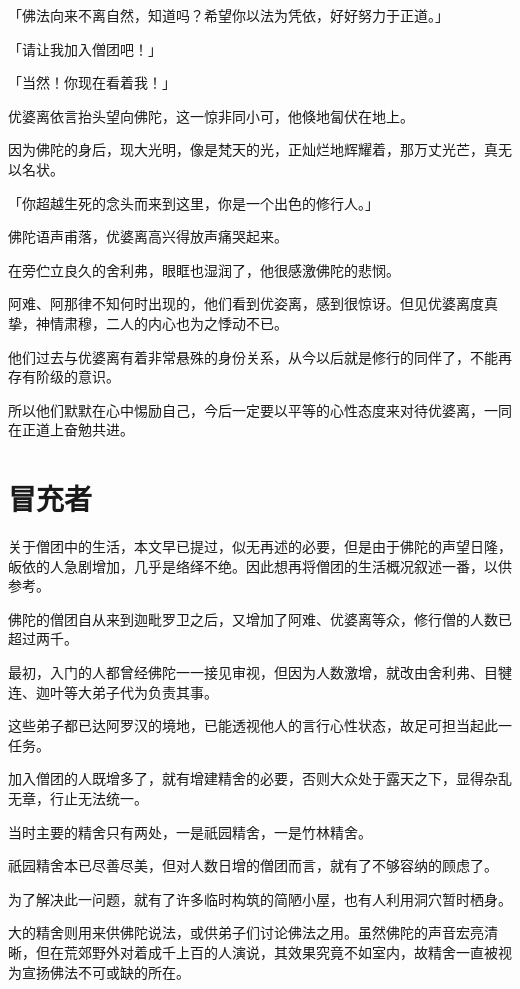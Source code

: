 \documentclass[twoside,openany]{book}
\begin{document}
「佛法向来不离自然，知道吗？希望你以法为凭依，好好努力于正道。」

「请让我加入僧团吧！」

「当然！你现在看着我！」

优婆离依言抬头望向佛陀，这一惊非同小可，他倏地匐伏在地上。

因为佛陀的身后，现大光明，像是梵天的光，正灿烂地辉耀着，那万丈光芒，真无以名状。

「你超越生死的念头而来到这里，你是一个出色的修行人。」

佛陀语声甫落，优婆离高兴得放声痛哭起来。

在旁伫立良久的舍利弗，眼眶也湿润了，他很感激佛陀的悲悯。

阿难、阿那律不知何时出现的，他们看到优姿离，感到很惊讶。但见优婆离度真挚，神情肃穆，二人的内心也为之悸动不已。

他们过去与优婆离有着非常悬殊的身份关系，从今以后就是修行的同伴了，不能再存有阶级的意识。

所以他们默默在心中惕励自己，今后一定要以平等的心性态度来对待优婆离，一同在正道上奋勉共进。

\section{冒充者}\label{sec9.4}

关于僧团中的生活，本文早已提过，似无再述的必要，但是由于佛陀的声望日隆，皈依的人急剧增加，几乎是络绎不绝。因此想再将僧团的生活概况叙述一番，以供参考。

佛陀的僧团自从来到迦毗罗卫之后，又增加了阿难、优婆离等众，修行僧的人数已超过两千。

最初，入门的人都曾经佛陀一一接见审视，但因为人数激增，就改由舍利弗、目犍连、迦叶等大弟子代为负责其事。

这些弟子都已达阿罗汉的境地，已能透视他人的言行心性状态，故足可担当起此一任务。

加入僧团的人既增多了，就有增建精舍的必要，否则大众处于露天之下，显得杂乱无章，行止无法统一。

当时主要的精舍只有两处，一是祇园精舍，一是竹林精舍。

祇园精舍本已尽善尽美，但对人数日增的僧团而言，就有了不够容纳的顾虑了。

为了解决此一问题，就有了许多临时构筑的简陋小屋，也有人利用洞穴暂时栖身。

大的精舍则用来供佛陀说法，或供弟子们讨论佛法之用。虽然佛陀的声音宏亮清晰，但在荒郊野外对着成千上百的人演说，其效果究竟不如室内，故精舍一直被视为宣扬佛法不可或缺的所在。
\end{document}
